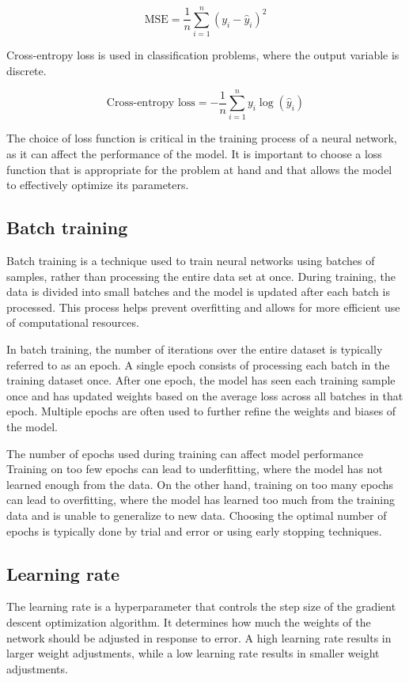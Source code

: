 \begin{equation}
  \text{MSE} = \frac{1}{n} \sum_{i=1}^{n} (y_i - \hat{y}_i)^2
\end{equation}

Cross-entropy loss is used in classification problems, where the output variable is discrete.

\begin{equation}
  \text{Cross-entropy loss} = - \frac{1}{n} \sum_{i=1}^{n} y_i \log(\hat{y}_i)
\end{equation}

The choice of loss function is critical in the training process of a neural network, as it can affect the performance of the model. 
It is important to choose a loss function that is appropriate for the problem at hand and that allows the model to effectively optimize its parameters.

\subsection{Batch training}
Batch training is a technique used to train neural networks using batches of samples, rather than processing the entire data set at once. 
During training, the data is divided into small batches and the model is updated after each batch is processed. 
This process helps prevent overfitting and allows for more efficient use of computational resources.

In batch training, the number of iterations over the entire dataset is typically referred to as an epoch. 
A single epoch consists of processing each batch in the training dataset once. 
After one epoch, the model has seen each training sample once and has updated weights based on the average loss across all batches in that epoch.
Multiple epochs are often used to further refine the weights and biases of the model.

The number of epochs used during training can affect model performance
Training on too few epochs can lead to underfitting, where the model has not learned enough from the data. 
On the other hand, training on too many epochs can lead to overfitting, where the model has learned too much from the training data and is unable to generalize to new data. 
Choosing the optimal number of epochs is typically done by trial and error or using early stopping techniques.

\subsection{Learning rate}
The learning rate is a hyperparameter that controls the step size of the gradient descent optimization algorithm.
It determines how much the weights of the network should be adjusted in response to error.
A high learning rate results in larger weight adjustments, while a low learning rate results in smaller weight adjustments.

